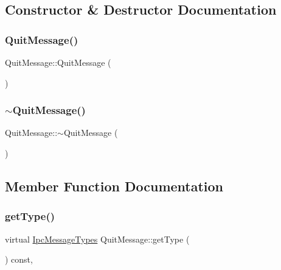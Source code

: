 \subsection{Constructor \& Destructor Documentation}
\mbox{\label{class_quit_message_a282aad21d179d720b75820780e596663}} 
\subsubsection{\texorpdfstring{QuitMessage()}{QuitMessage()}}
{\footnotesize\ttfamily Quit\+Message\+::\+Quit\+Message (\begin{DoxyParamCaption}{ }\end{DoxyParamCaption})\hspace{0.3cm}{\ttfamily [inline]}}

\mbox{\label{class_quit_message_a9a3b49405ba6fab65736ec15d6c3640e}} 
\subsubsection{\texorpdfstring{$\sim$QuitMessage()}{~QuitMessage()}}
{\footnotesize\ttfamily Quit\+Message\+::$\sim$\+Quit\+Message (\begin{DoxyParamCaption}{ }\end{DoxyParamCaption})\hspace{0.3cm}{\ttfamily [inline]}}



\subsection{Member Function Documentation}
\mbox{\label{class_quit_message_aacd6dd8d6b63c685151bfd54c1edc990}} 
\subsubsection{\texorpdfstring{getType()}{getType()}}
{\footnotesize\ttfamily virtual \mbox{\hyperlink{ipcmsgtypes_8h_a59f75a61492e64aebfae0cc49cc26683}{Ipc\+Message\+Types}} Quit\+Message\+::get\+Type (\begin{DoxyParamCaption}{ }\end{DoxyParamCaption}) const\hspace{0.3cm}{\ttfamily [inline]}, {\ttfamily [virtual]}}



